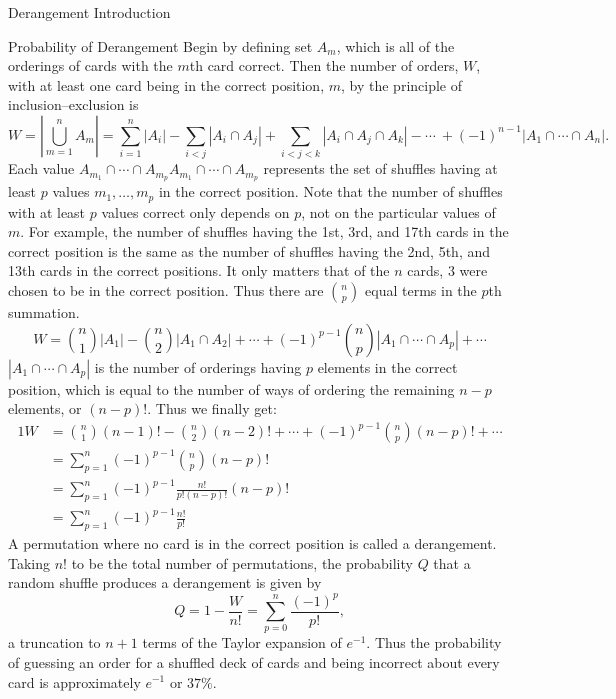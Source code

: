 \mynewpage

\begin{example}[exp:]{Derangement Introduction}
\end{example}

\begin{mysubsection}{Probability of Derangement}
    Begin by defining set $A_m$, which is all of the orderings of cards with the $m$th card correct. Then the number of orders, $W$, with at least one card being in the correct position, $m$, by the principle of inclusion–exclusion is
    \[{\displaystyle W=\left|\bigcup _{m=1}^{n}A_{m}\right|=\sum_{i=1}^n\left|A_i\right| -\sum_{i < j}\left|A_i\cap A_j\right| +\sum_{i<j<k}\left|A_i\cap A_j\cap A_k\right|-\cdots\ +(-1)^{n-1} \left|A_1\cap\cdots\cap A_n\right|{}.}\]
    Each value ${\displaystyle A_{m_{1}}\cap \cdots \cap A_{m_{p}}} A_{{m_{1}}}\cap \cdots \cap A_{{m_{p}}}$ represents the set of shuffles having at least $p$ values $m_1,\dots ,m_p$ in the correct position. Note that the number of shuffles with at least $p$ values correct only depends on $p$, not on the particular values of $m$. For example, the number of shuffles having the 1st, 3rd, and 17th cards in the correct position is the same as the number of shuffles having the 2nd, 5th, and 13th cards in the correct positions. It only matters that of the $n$ cards, $3$ were chosen to be in the correct position. Thus there are ${n \choose p}$ equal terms in the $p$th summation.
    \[{\displaystyle W={n \choose 1}|A_{1}|-{n \choose 2}|A_{1}\cap A_{2}|+\cdots +(-1)^{p-1}{n \choose p}|A_{1}\cap \cdots \cap A_{p}|+\cdots }\]
    ${\displaystyle |A_{1}\cap \cdots \cap A_{p}|}$ is the number of orderings having $p$ elements in the correct position, which is equal to the number of ways of ordering the remaining $n - p$ elements, or $(n - p)!$. Thus we finally get:
    \begin{alignat*}{1}
        W&={n \choose 1}(n-1)!-{n \choose 2}(n-2)!+\cdots +(-1)^{p-1}{n \choose p}(n-p)!+\cdots \\&=\sum _{p=1}^{n}(-1)^{p-1}{n \choose p}(n-p)!\\&=\sum _{p=1}^{n}(-1)^{p-1}{\frac {n!}{p!(n-p)!}}(n-p)!\\&=\sum _{p=1}^{n}(-1)^{p-1}{\frac {n!}{p!}}
    \end{alignat*}
    A permutation where no card is in the correct position is called a derangement. Taking $n!$ to be the total number of permutations, the probability $Q$ that a random shuffle produces a derangement is given by
    \[Q=1-{\frac {W}{n!}}=\sum _{{p=0}}^{n}{\frac {(-1)^{p}}{p!}},\]
    a truncation to $n+1$ terms of the Taylor expansion of $e^{-1}$. Thus the probability of guessing an order for a shuffled deck of cards and being incorrect about every card is approximately $e^{-1}$ or $37\%$.
\end{mysubsection}



